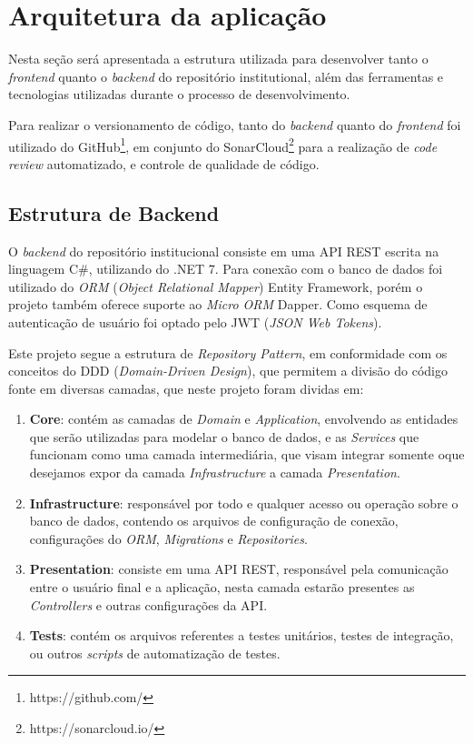 \section{Arquitetura da aplicação}

Nesta seção será apresentada a estrutura utilizada para desenvolver tanto o
\emph{frontend} quanto o \emph{backend} do repositório institutional, além das
ferramentas e tecnologias utilizadas durante o processo de desenvolvimento.

Para realizar o versionamento de código, tanto do \emph{backend} quanto do
\emph{frontend} foi utilizado do GitHub\footnote{https://github.com/}, em
conjunto do SonarCloud\footnote{https://sonarcloud.io/} para a realização
de \emph{code review} automatizado, e controle de qualidade de código.

\subsection{Estrutura de Backend}

O \emph{backend} do repositório institucional consiste em uma API REST escrita na
linguagem C\#, utilizando do .NET 7. Para conexão com o banco de dados foi utilizado
do \emph{ORM} (\emph{Object Relational Mapper}) Entity Framework, porém o projeto
também oferece suporte ao \emph{Micro ORM} Dapper. Como esquema de autenticação
de usuário foi optado pelo JWT (\emph{JSON Web Tokens}).

Este projeto segue a estrutura de \emph{Repository Pattern}, em conformidade com os
conceitos do DDD (\emph{Domain-Driven Design}), que permitem a divisão do código
fonte em diversas camadas, que neste projeto foram dividas em:

\begin{enumerate}
    \item \textbf{Core}: contém as camadas de \emph{Domain} e \emph{Application},
          envolvendo as entidades que serão utilizadas para modelar o banco de dados,
          e as \emph{Services} que funcionam como uma camada intermediária, que visam
          integrar somente oque desejamos expor da camada \emph{Infrastructure} a
          camada \emph{Presentation}.

    \item \textbf{Infrastructure}: responsável por todo e qualquer acesso ou operação
          sobre o banco de dados, contendo os arquivos de configuração de conexão,
          configurações do \emph{ORM}, \emph{Migrations} e \emph{Repositories}.

    \item \textbf{Presentation}: consiste em uma API REST, responsável pela comunicação
          entre o usuário final e a aplicação, nesta camada estarão presentes as
          \emph{Controllers} e outras configurações da API.

    \item \textbf{Tests}: contém os arquivos referentes a testes unitários, testes de
          integração, ou outros \emph{scripts} de automatização de testes.
\end{enumerate}

